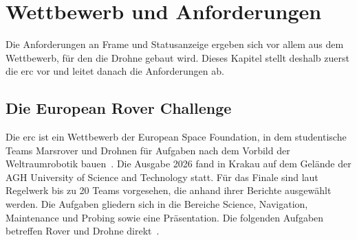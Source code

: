 \chapter{Wettbewerb und Anforderungen}
\label{ch:Hintergrund}

Die Anforderungen an Frame und Statusanzeige ergeben sich vor allem aus dem Wettbewerb, für den die Drohne gebaut wird. Dieses Kapitel stellt deshalb zuerst die \gls{erc} vor und leitet danach die Anforderungen ab.

\section{Die European Rover Challenge}
\label{sec:ERC}

Die \gls{erc} ist ein Wettbewerb der European Space Foundation, in dem studentische Teams Marsrover und Drohnen für Aufgaben nach dem Vorbild der Weltraumrobotik bauen~\cite{ercRules2026}. Die Ausgabe 2026 fand in Krakau auf dem Gelände der AGH University of Science and Technology statt. Für das Finale sind laut Regelwerk bis zu 20 Teams vorgesehen, die anhand ihrer Berichte ausgewählt werden. Die Aufgaben gliedern sich in die Bereiche Science, Navigation, Maintenance und Probing sowie eine Präsentation. Die folgenden Aufgaben betreffen Rover und Drohne direkt~\cite{ercRules2026}. %

